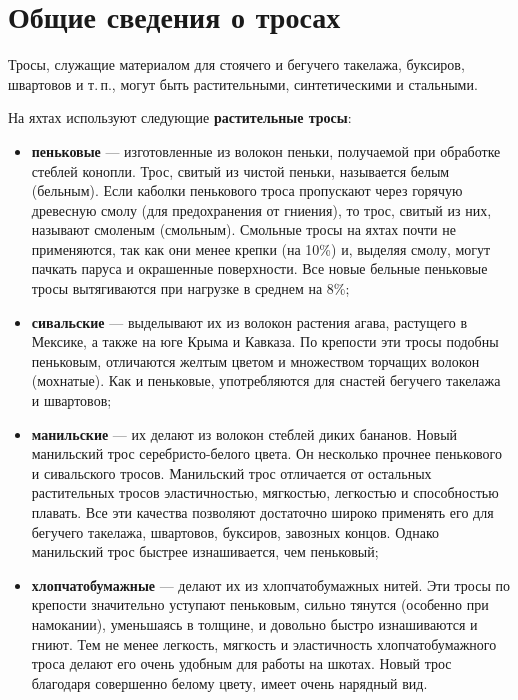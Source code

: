 \documentclass[a4paper, 12pt, twoside, final]{scrbook}
\begin{document}
\section{Общие сведения о тросах}

Тросы, служащие материалом для стоячего и бегучего такелажа, буксиров, швартовов и т.\,п., могут быть растительными, синтетическими и стальными.

На яхтах используют следующие \textbf{растительные тросы}:
\begin{itemize}
\item \textbf{пеньковые} --- изготовленные из волокон пеньки, получаемой при обработке стеблей конопли. Трос, свитый из чистой пеньки, называется белым (бельным). Если каболки пенькового троса пропускают через горячую древесную смолу (для предохранения от гниения), то трос, свитый из них, называют смоленым (смольным). Смольные тросы на яхтах почти не применяются, так как они менее крепки (на 10\%) и, выделяя смолу, могут пачкать паруса и окрашенные поверхности. Все новые бельные пеньковые тросы вытягиваются при нагрузке в среднем на 8\%;
\item \textbf{сивальские} --- выделывают их из волокон растения агава, растущего в Мексике, а также на юге Крыма и Кавказа. По крепости эти тросы подобны пеньковым, отличаются желтым цветом и множеством торчащих волокон (мохнатые). Как и пеньковые, употребляются для снастей бегучего такелажа и швартовов;
\item \textbf{манильские} --- их делают из волокон стеблей диких бананов. Новый манильский трос серебристо-белого цвета. Он несколько прочнее пенькового и сивальского тросов. Манильский трос отличается от остальных растительных тросов эластичностью, мягкостью, легкостью и способностью плавать. Все эти качества позволяют достаточно широко применять его для бегучего такелажа, швартовов, буксиров, завозных концов. Однако манильский трос быстрее изнашивается, чем пеньковый;
\item \textbf{хлопчатобумажные} --- делают их из хлопчатобумажных нитей. Эти тросы по крепости значительно уступают пеньковым, сильно тянутся (особенно при намокании), уменьшаясь в толщине, и довольно быстро изнашиваются и гниют. Тем не менее легкость, мягкость и эластичность хлопчатобумажного троса делают его очень удобным для работы на шкотах. Новый трос благодаря совершенно белому цвету, имеет очень нарядный вид.
\end{itemize}
\end{document}
